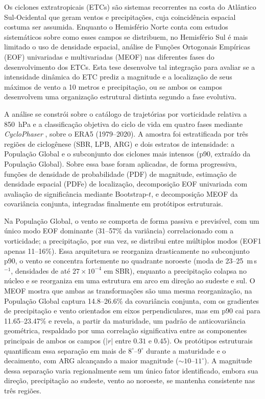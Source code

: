 Os ciclones extratropicais (ETCs) são sistemas recorrentes na costa do Atlântico Sul-Ocidental que geram ventos e precipitações, cuja coincidência espacial costuma ser assumida.
Enquanto o Hemisfério Norte conta com estudos sistemáticos sobre como esses campos se distribuem, no Hemisfério Sul é mais limitado o uso de densidade espacial, análise de Funções Ortogonais Empíricas (EOF) univariadas e multivariadas (MEOF) nas diferentes fases do desenvolvimento dos ETCs.
Esta tese desenvolve tal integração para avaliar se a intensidade dinâmica do ETC prediz a magnitude e a localização de seus máximos de vento a 10 metros e precipitação, ou se ambos os campos desenvolvem uma organização estrutural distinta segundo a fase evolutiva.

A análise se constrói sobre o catálogo de trajetórias por vorticidade relativa a 850~hPa \citep{gramcianinov2020analysis} e a classificação objetiva do ciclo de vida em quatro fases mediante \textit{CycloPhaser} \citep{coutodesouza2024new, deSouza2025CycloPhaser}, sobre o ERA5 (1979--2020).
A amostra foi estratificada por três regiões de ciclogênese (SBR, LPB, ARG) e dois estratos de intensidade: a População Global e o subconjunto dos ciclones mais intensos (p90, extraído da População Global).
Sobre essa base foram aplicadas, de forma progressiva, funções de densidade de probabilidade (PDF) de magnitude, estimação de densidade espacial (PDFe) de localização, decomposição EOF univariada com avaliação de significância mediante Bootstrap-$t$, e decomposição MEOF da covariância conjunta, integradas finalmente em protótipos estruturais.

Na População Global, o vento se comporta de forma passiva e previsível, com um único modo EOF dominante (31--57\% da variância) correlacionado com a vorticidade; a precipitação, por sua vez, se distribui entre múltiplos modos (EOF1 apenas 11--16\%).
Essa arquitetura se reorganiza drasticamente no subconjunto p90, o vento se concentra fortemente no quadrante noroeste (moda de 23--25~m\,s$^{-1}$, densidades de até $27\times10^{-4}$ em SBR), enquanto a precipitação colapsa no núcleo e se reorganiza em uma estrutura em arco em direção ao sudeste e sul.
O MEOF mostra que ambas as transformações são uma mesma reorganização, na População Global captura 14.8--26.6\% da covariância conjunta, com os gradientes de precipitação e vento orientados em eixos perpendiculares, mas em p90 cai para 11.65--23.47\% e revela, a partir da maturidade, um padrão de anticovariância geométrica, respaldado por uma correlação significativa entre as componentes principais de ambos os campos ($|r|$ entre $0.31$ e $0.45$).
Os protótipos estruturais quantificam essa separação em mais de $8^{\circ}$--$9^{\circ}$ durante a maturidade e o decaimento, com ARG alcançando a maior magnitude (${\sim}10$--$11^{\circ}$).
A magnitude dessa separação varia regionalmente sem um único fator identificado, embora sua direção, precipitação ao sudeste, vento ao noroeste, se mantenha consistente nas três regiões.

